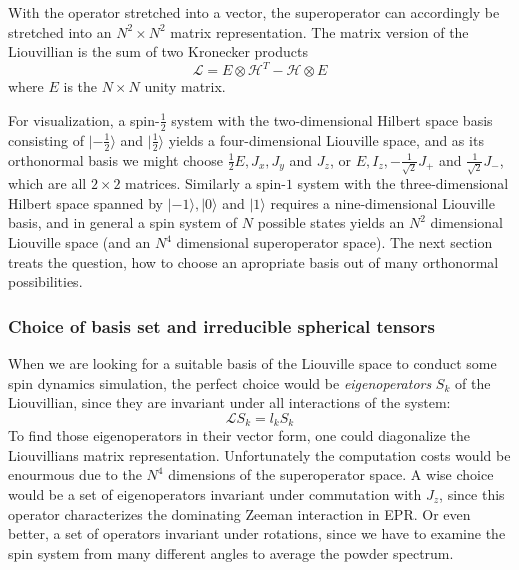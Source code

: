 \documentclass[11.5pt,a4paper]{article}
\begin{document}
With the operator stretched into a vector, the superoperator can accordingly be stretched into an $N^2 \times N^2$ matrix representation. The matrix version of the Liouvillian is the sum of two Kronecker products
\begin{equation}
 \mathcal{L} = E \otimes \mathcal{H}^T - \mathcal{H} \otimes E
\end{equation}
where $E$ is the $N \times N$ unity matrix. 

For visualization, a spin-$\tfrac{1}{2}$ system with the two-dimensional Hilbert space basis consisting of $|-\tfrac{1}{2}\rangle$ and $|\tfrac{1}{2}\rangle$ yields a four-dimensional Liouville space, and as its orthonormal basis we might choose $\tfrac{1}{2}E, J_x, J_y$ and $J_z$, or $E, I_z, -\tfrac{1}{\sqrt{2}} J_+$ and $\tfrac{1}{\sqrt{2}} J_-$, which are all $2\times 2$ matrices. Similarly a spin-$1$ system with the three-dimensional Hilbert space spanned by $|-1\rangle, |0\rangle$ and $|1\rangle$ requires a nine-dimensional Liouville basis, and in general a spin system of $N$ possible states yields an $N^2$ dimensional Liouville space (and an $N^4$ dimensional superoperator space). 
The next section treats the question, how to choose an apropriate basis out of many orthonormal possibilities.

\subsubsection{Choice of basis set and irreducible spherical tensors}
When we are looking for a suitable basis of the Liouville space to conduct some spin dynamics simulation, the perfect choice would be \emph{eigenoperators} $S_k$ of the Liouvillian, since they are invariant under all interactions of the system:
\begin{equation}
  \mathcal{L} S_k = l_k S_k
\end{equation}
To find those eigenoperators in their vector form, one could diagonalize the Liouvillians matrix representation. Unfortunately the computation costs would be enourmous due to the $N^4$ dimensions of the superoperator space. A wise choice would be a set of eigenoperators invariant under commutation with $J_z$, since this operator characterizes the dominating Zeeman interaction in EPR. Or even better, a set of operators invariant under rotations, since we have to examine the spin system from many different angles to average the powder spectrum.
\end{document}
